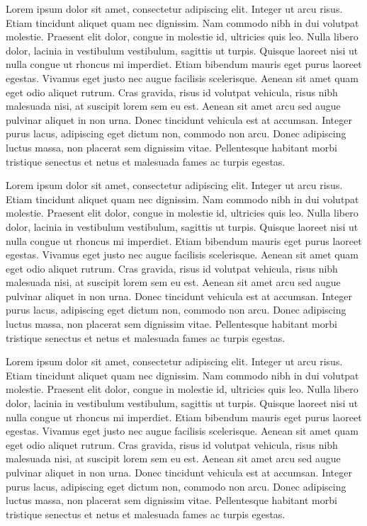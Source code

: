 Lorem ipsum dolor sit amet, consectetur adipiscing elit.\citep{Nacuzzi:2007} Integer ut arcu risus. Etiam tincidunt aliquet quam nec dignissim. Nam commodo nibh in dui volutpat molestie. Praesent elit dolor, congue in molestie id, ultricies quis leo. Nulla libero dolor, lacinia in vestibulum vestibulum, sagittis ut turpis. Quisque laoreet nisi ut nulla congue ut rhoncus mi imperdiet. Etiam bibendum mauris eget purus laoreet egestas.\citep{Cooper:1939} Vivamus eget justo nec augue facilisis scelerisque. Aenean sit amet quam eget odio aliquet rutrum. Cras gravida, risus id volutpat vehicula, risus nibh malesuada nisi, at suscipit lorem sem eu est. Aenean sit amet arcu sed augue pulvinar aliquet in non urna. Donec tincidunt vehicula est at accumsan. Integer purus lacus, adipiscing eget dictum non, commodo non arcu. Donec adipiscing luctus massa, non placerat sem dignissim vitae. Pellentesque habitant morbi tristique senectus et netus et malesuada fames ac turpis egestas.\citep{Fernandez:1892,carlin2010linguistics}

Lorem ipsum dolor sit amet, consectetur adipiscing elit.\citep{Nacuzzi:2007} Integer ut arcu risus. Etiam tincidunt aliquet quam nec dignissim. Nam commodo nibh in dui volutpat molestie. Praesent elit dolor, congue in molestie id, ultricies quis leo. Nulla libero dolor, lacinia in vestibulum vestibulum, sagittis ut turpis. Quisque laoreet nisi ut nulla congue ut rhoncus mi imperdiet. Etiam bibendum mauris eget purus laoreet egestas.\citep{Cooper:1939} Vivamus eget justo nec augue facilisis scelerisque. Aenean sit amet quam eget odio aliquet rutrum. Cras gravida, risus id volutpat vehicula, risus nibh malesuada nisi, at suscipit lorem sem eu est. Aenean sit amet arcu sed augue pulvinar aliquet in non urna. Donec tincidunt vehicula est at accumsan. Integer purus lacus, adipiscing eget dictum non, commodo non arcu. Donec adipiscing luctus massa, non placerat sem dignissim vitae. Pellentesque habitant morbi tristique senectus et netus et malesuada fames ac turpis egestas.\citep{Fernandez:1892,carlin2010linguistics}

Lorem ipsum dolor sit amet, consectetur adipiscing elit.\citep{Nacuzzi:2007} Integer ut arcu risus. Etiam tincidunt aliquet quam nec dignissim. Nam commodo nibh in dui volutpat molestie. Praesent elit dolor, congue in molestie id, ultricies quis leo. Nulla libero dolor, lacinia in vestibulum vestibulum, sagittis ut turpis. Quisque laoreet nisi ut nulla congue ut rhoncus mi imperdiet. Etiam bibendum mauris eget purus laoreet egestas.\citep{Cooper:1939} Vivamus eget justo nec augue facilisis scelerisque. Aenean sit amet quam eget odio aliquet rutrum. Cras gravida, risus id volutpat vehicula, risus nibh malesuada nisi, at suscipit lorem sem eu est. Aenean sit amet arcu sed augue pulvinar aliquet in non urna. Donec tincidunt vehicula est at accumsan. Integer purus lacus, adipiscing eget dictum non, commodo non arcu. Donec adipiscing luctus massa, non placerat sem dignissim vitae. Pellentesque habitant morbi tristique senectus et netus et malesuada fames ac turpis egestas.\citep{Fernandez:1892,carlin2010linguistics}
